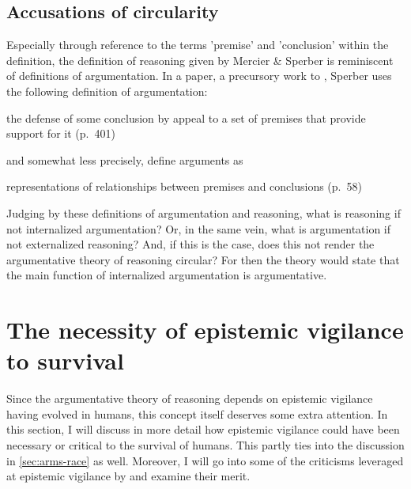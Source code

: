 \subsection{Accusations of circularity}

Especially through reference to the terms 'premise' and 'conclusion' within the definition, the definition of reasoning given by Mercier \& Sperber is reminiscent of definitions of argumentation. In a \citeyear{Sperber01} paper, a precursory work to \citet{MS11}, Sperber uses the following definition of argumentation:
\begin{quoting}
    the defense of some conclusion by appeal to a set of premises that provide support for it
    \hfill (p.~401)
\end{quoting}
and somewhat less precisely, \citet{MS11} define arguments as
\begin{quoting}
    representations of relationships between premises and conclusions
    \hfill (p.~58)
\end{quoting}

Judging by these definitions of argumentation and reasoning, what is reasoning if not internalized argumentation? Or, in the same vein, what is argumentation if not externalized reasoning? And, if this is the case, does this not render the argumentative theory of reasoning circular? For then the theory would state that the main function of internalized argumentation is argumentative.

\section{The necessity of epistemic vigilance to survival}
\label{sec:epi-vigil-crit}

Since the argumentative theory of reasoning depends on epistemic vigilance having evolved in humans, this concept itself deserves some extra attention.
In this section, I will discuss in more detail how epistemic vigilance could have been necessary or critical to the survival of humans. This partly ties into the discussion in \cref{sec:arms-race} as well.
Moreover, I will go into some of the criticisms leveraged at epistemic vigilance by \citet{Michaelian13} and examine their merit.

